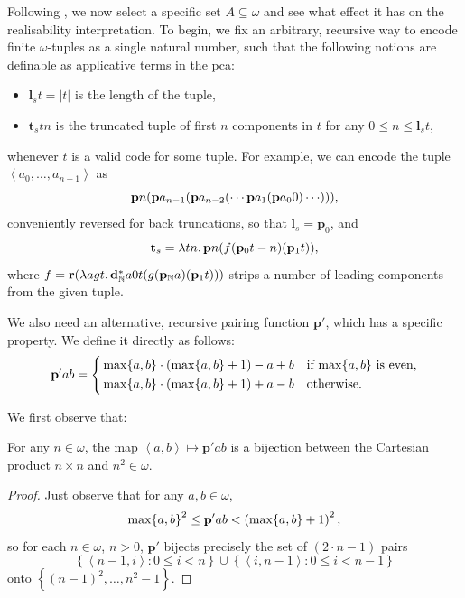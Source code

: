 \documentclass[12pt,openany]{book}
\makeatletter
\newcommand\indg[1]{\index{A@General!#1}}
\theoremstyle{plain}
\theoremstyle{definition}
\newcommand\tuple[1]{\left\langle #1 \right\rangle}
\newcommand\oplam[1]{\mathop{\lambda #1.}}
\newcommand\KP{\mathrm{KP}}
\newcommand\bp{\mathbf{p}}
\newcommand\br{\mathbf{r}}
\newcommand\bpN{\mathbf{p}_\mathbb{N}}
\newcommand\bdN{\mathbf{d}_\mathbb{N}}
\newcommand\bl{\mathbf{l}}
\newcommand\bt{\mathbf{t}}
\makeatother
\begin{document}
Following \cite{wang-sw26-czf-v-l-pre}, we now select a specific set $A \subseteq \omega$ and see what effect it has on the realisability interpretation. To begin, we fix an arbitrary, recursive way to encode finite $\omega$-tuples as a single natural number, such that the following notions are definable as applicative terms in the pca:
\begin{itemize}
  \item $\bl_s t = \left|t\right|$ is the length of the tuple,
  \item $\bt_s tn$ is the truncated tuple of first $n$ components in $t$ for any $0 \leq n \leq \bl_s t$,
\end{itemize}
whenever $t$ is a valid code for some tuple. For example, we can encode the tuple $\tuple{a_0, \ldots, a_{n - 1}}$ as
\[\bp n \mleft(\bp a_{n - 1} \mleft(\bp a_{n - 2} \mleft(\cdots \bp a_1 \mleft(\bp a_0 0\mright) \cdots \mright)\mright)\mright),\]
conveniently reversed for back truncations, so that $\bl_s = \bp_0$, and
\[\bt_s = \oplam{tn} \bp n \mleft(f \mleft(\bp_0 t - n\mright) \mleft(\bp_1 t\mright)\mright),\]
where $f = \br \mleft(\oplam{agt} \bdN^* a0t \mleft(g \mleft(\bpN a\mright) \mleft(\bp_1 t\mright)\mright)\mright)$ strips a number of leading components from the given tuple.

We also need an alternative, recursive pairing function $\bp'$, which has a specific property. We define it directly as follows\indg{pairing function}:
\[\bp' ab = \left\{\begin{aligned}
     & \max\mleft\{a, b\mright\} \cdot \left(\max\mleft\{a, b\mright\} + 1\right) - a + b &  & \text{if $\max\mleft\{a, b\mright\}$ is even}, \\
     & \max\mleft\{a, b\mright\} \cdot \left(\max\mleft\{a, b\mright\} + 1\right) + a - b &  & \text{otherwise}.
  \end{aligned}\right.\]

We first observe that:
\begin{lemma}[$\KP$]
  \label{lem:max-pairing-bij}
  For any $n \in \omega$, the map $\tuple{a, b} \mapsto \bp' ab$ is a bijection between the Cartesian product $n \times n$ and $n^2 \in \omega$.
\end{lemma}

\begin{proof}
  Just observe that for any $a, b \in \omega$,
  \[\max\mleft\{a, b\mright\}^2 \leq \bp' ab < \left(\max\mleft\{a, b\mright\} + 1\right)^2,\]
  so for each $n \in \omega$, $n > 0$, $\bp'$ bijects precisely the set of $\left(2 \cdot n - 1\right)$ pairs
  \[\left\{\tuple{n - 1, i} : 0 \leq i < n\right\} \cup \left\{\tuple{i, n - 1} : 0 \leq i < n - 1\right\}\]
  onto $\left\{\left(n - 1\right)^2, \ldots, n^2 - 1\right\}$.
\end{proof}
\end{document}
